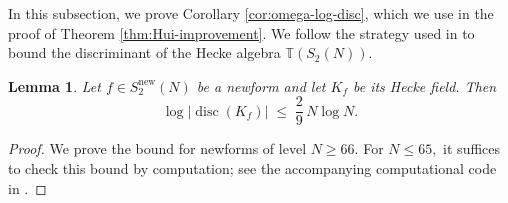 \documentclass[11pt,letterpaper,reqno]{amsart}
\newtheorem{lemma}[theorem]{Lemma}
\theoremstyle{definition}
\numberwithin{equation}{section}
\numberwithin{figure}{section}
\numberwithin{table}{section}
\begin{document}
In this subsection, we prove Corollary \ref{cor:omega-log-disc}, which we use in the proof of Theorem \ref{thm:Hui-improvement}. We follow the strategy used in \cite[Lemma 4.1]{Bruin2011ComputingCoefficients} to bound the discriminant of the Hecke algebra $\mathbb{T}(S_2(N))$.

\begin{lemma}\label{lem:disc-bound}
Let $f \in S_2^{\mathrm{new}}(N)$ be a newform and let $K_f$ be its Hecke field. Then
\[
\log \bigl|\operatorname{disc}(K_f)\bigr| \;\le\; \frac{2}{9} \,  N  \log N.
\]
\end{lemma}

\begin{proof}
We prove the bound for newforms of level $N \geq 66.$ For $N \le 65,$ it suffices to check this bound by computation; see the accompanying computational code in \cite{code2}.


\end{proof}
\end{document}
